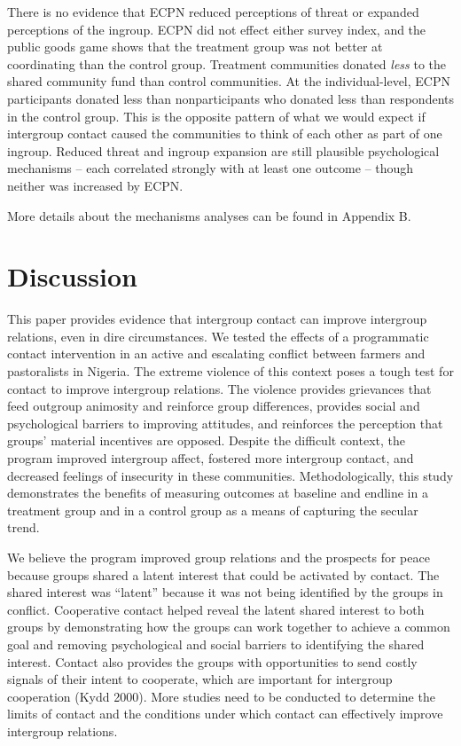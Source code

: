 \documentclass[11pt]{article}
\begin{document}
There is no evidence that ECPN reduced perceptions of threat or expanded
perceptions of the ingroup. ECPN did not effect either survey index, and
the public goods game shows that the treatment group was not better at
coordinating than the control group. Treatment communities donated
\emph{less} to the shared community fund than control communities. At
the individual-level, ECPN participants donated less than
nonparticipants who donated less than respondents in the control group.
This is the opposite pattern of what we would expect if intergroup
contact caused the communities to think of each other as part of one
ingroup. Reduced threat and ingroup expansion are still plausible
psychological mechanisms -- each correlated strongly with at least one
outcome -- though neither was increased by ECPN.

More details about the mechanisms analyses can be found in Appendix B.

\hypertarget{discussion}{%
\section{Discussion}\label{discussion}}

This paper provides evidence that intergroup contact can improve
intergroup relations, even in dire circumstances. We tested the effects
of a programmatic contact intervention in an active and escalating
conflict between farmers and pastoralists in Nigeria. The extreme
violence of this context poses a tough test for contact to improve
intergroup relations. The violence provides grievances that feed
outgroup animosity and reinforce group differences, provides social and
psychological barriers to improving attitudes, and reinforces the
perception that groups' material incentives are opposed. Despite the
difficult context, the program improved intergroup affect, fostered more
intergroup contact, and decreased feelings of insecurity in these
communities. Methodologically, this study demonstrates the benefits of
measuring outcomes at baseline and endline in a treatment group and in a
control group as a means of capturing the secular trend.

We believe the program improved group relations and the prospects for
peace because groups shared a latent interest that could be activated by
contact. The shared interest was ``latent'' because it was not being
identified by the groups in conflict. Cooperative contact helped reveal
the latent shared interest to both groups by demonstrating how the
groups can work together to achieve a common goal and removing
psychological and social barriers to identifying the shared interest.
Contact also provides the groups with opportunities to send costly
signals of their intent to cooperate, which are important for intergroup
cooperation (Kydd 2000). More studies need to be conducted to determine
the limits of contact and the conditions under which contact can
effectively improve intergroup relations.
\end{document}
